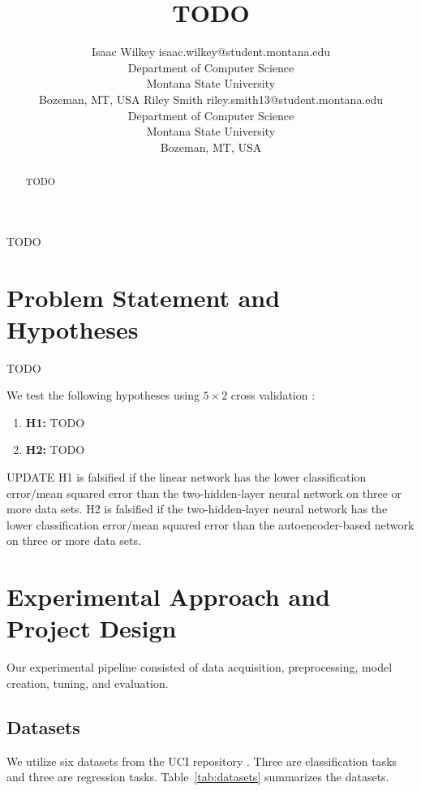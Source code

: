 \documentclass[twoside,11pt]{article}
\begin{document}
\title{TODO}

\author{\name Isaac Wilkey \email isaac.wilkey@student.montana.edu\\
\addr Department of Computer Science \\
Montana State University \\
Bozeman, MT, USA
\AND
\name Riley Smith \email riley.smith13@student.montana.edu\\
\addr Department of Computer Science \\
Montana State University \\
Bozeman, MT, USA
}

\maketitle

\begin{abstract}
TODO

\end{abstract}

\begin{keywords}TODO\end{keywords}

\section{Problem Statement and Hypotheses}
TODO

We test the following hypotheses using $5 \times 2$ cross validation \citep{alpaydin2020}:
\begin{enumerate}
    \item \textbf{H1:} TODO
    \item \textbf{H2:} TODO
\end{enumerate}
UPDATE H1 is falsified if the linear network has the lower classification error/mean squared error than the two-hidden-layer neural network on three or more data sets. H2 is falsified if the two-hidden-layer neural network has the lower classification error/mean squared error than the autoencoder-based network on three or more data sets.


\section{Experimental Approach and Project Design}
Our experimental pipeline consisted of data acquisition, preprocessing, model creation,
tuning, and evaluation.

\subsection{Datasets}
We utilize six datasets from the UCI repository \citep{uci_repository}. Three are classification tasks and three are regression tasks. Table~\ref{tab:datasets} summarizes the datasets.
\end{document}
